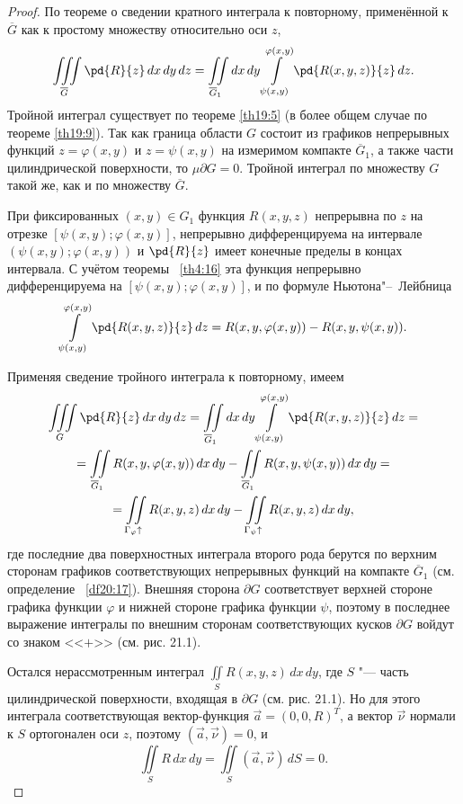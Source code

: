 \begin{proof}
По теореме о сведении кратного интеграла к повторному, применённой к $\overline{G}$ как к простому множеству относительно оси $z$,
$$
\iiint\limits_{\overline{G}} \pd{R}{z}\,dx\,dy\,dz = \iint\limits_{\overline{G}_1} dx\,dy \int\limits_{\psi(x,y)}^{\varphi(x,y)} \pd{R(x, y, z)}{z}\,dz.
$$
Тройной интеграл существует по теореме \ref{th19:5} (в более общем случае по теореме \ref{th19:9}). Так как граница области $G$ состоит из графиков непрерывных функций $z = \varphi(x, y)$ и $z = \psi(x, y)$ на измеримом компакте $\overline{G}_1$, а также части цилиндрической поверхности, то $\mu \partial G = 0$. Тройной интеграл по множеству $G$ такой же, как и по множеству $\overline{G}$.

При фиксированных $(x, y) \in G_1$ функция $R(x, y, z)$ непрерывна по $z$ на отрезке $[\psi(x, y); \varphi(x, y)]$, непрерывно дифференцируема на интервале $(\psi(x, y); \varphi(x, y))$ и $\pd{R}{z}$ имеет конечные пределы в концах интервала. С учётом теоремы ~\ref{th4:16} эта функция непрерывно дифференцируема на $[\psi(x, y); \varphi(x, y)]$, и по формуле Ньютона"--~Лейбница
$$
\int\limits_{\psi(x,y)}^{\varphi(x,y)} \pd{R(x, y, z)}{z}\,dz = R(x, y, \varphi(x, y)) - R(x, y, \psi(x, y)).
$$

Применяя сведение тройного интеграла к повторному, имеем
\begin{multline*}
\iiint\limits_G \pd{R}{z}\,dx\,dy\,dz = \iint\limits_{\overline{G}_1} dx\,dy \int\limits_{\psi(x,y)}^{\varphi(x,y)} \pd{R(x, y, z)}{z}\,dz = \\
= \iint\limits_{\overline{G}_1} R(x, y, \varphi(x, y))\,dx\,dy - \iint\limits_{\overline{G}_1} R(x, y, \psi(x, y))\,dx\,dy = \\
= \iint\limits_{\Gamma_\varphi \uparrow} R(x, y, z)\,dx\,dy - \iint\limits_{\Gamma_\psi \uparrow} R(x, y, z)\,dx\,dy,
\end{multline*}
где последние два поверхностных интеграла второго рода берутся по верхним сторонам графиков соответствующих непрерывных функций на компакте $\overline{G}_1$ (см. определение ~\ref{df20:17}). Внешняя сторона $\partial G$ соответствует верхней стороне графика функции $\varphi$ и нижней стороне графика функции $\psi$, поэтому в последнее выражение интегралы по внешним сторонам соответствующих кусков $\partial G$ войдут со знаком <<$+$>> (см. рис. 21.1).

Остался нерассмотренным интеграл $\iint\limits_S R(x, y, z)\,dx\,dy$, где $S$ "--- часть цилиндрической поверхности, входящая в $\partial G$ (см. рис. 21.1). Но для этого интеграла соответствующая вектор-функция $\vec{a} = (0, 0, R)^T$, а вектор $\vec{\nu}$ нормали к $S$ ортогонален оси $z$, поэтому $(\vec{a}, \vec{\nu}) = 0$, и
$$
\iint\limits_S R\,dx\,dy = \iint\limits_S (\vec{a}, \vec{\nu})\,dS = 0.
$$


\end{proof}
